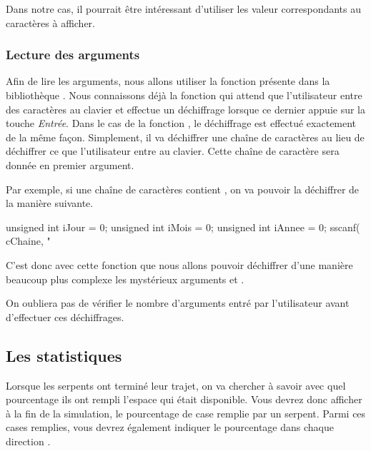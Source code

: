 \documentclass[a4paper]{article}
\begin{document}
				Dans notre cas, il pourrait être intéressant d'utiliser les valeur  correspondants au caractères à afficher.

			\subsubsection{Lecture des arguments}
				Afin de lire les arguments, nous allons utiliser la fonction  présente dans la bibliothèque .
				Nous connaissons déjà la fonction  qui attend que l'utilisateur entre des caractères au clavier et effectue un déchiffrage lorsque ce dernier appuie sur la touche \emph{Entrée}.
				Dans le cas de la fonction , le déchiffrage est effectué exactement de la même façon.
				Simplement, il va déchiffrer une chaîne de caractères au lieu de déchiffrer ce que l'utilisateur entre au clavier.
				Cette chaîne de caractère sera donnée en premier argument.

				Par exemple, si une chaîne de caractères  contient , on va pouvoir la déchiffrer de la manière suivante.
				\begin{Code*}
unsigned int iJour = 0;
unsigned int iMois = 0;
unsigned int iAnnee = 0;
sscanf( cChaine, "%
				\end{Code*}

				C'est donc avec cette fonction que nous allons pouvoir déchiffrer d'une manière beaucoup plus complexe les mystérieux arguments  et .

				On oubliera pas de vérifier le nombre d'arguments entré par l'utilisateur avant d'effectuer ces déchiffrages.

		\subsection{Les statistiques}
			Lorsque les serpents ont terminé leur trajet, on va chercher à savoir avec quel pourcentage ils ont rempli l'espace qui était disponible.
			Vous devrez donc afficher à la fin de la simulation, le pourcentage de case remplie par un serpent.
			Parmi ces cases remplies, vous devrez également indiquer le pourcentage dans chaque direction .

\end{document}
